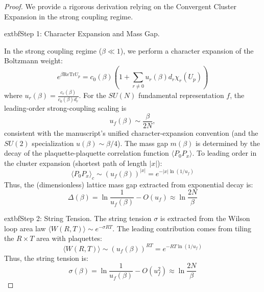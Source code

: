 \begin{proof}
We provide a rigorous derivation relying on the Convergent Cluster Expansion in the strong coupling regime.

		extbf{Step 1: Character Expansion and Mass Gap.}

In the strong coupling regime ($\beta \ll 1$), we perform a character expansion of the Boltzmann weight:
\begin{equation}
\label{eq:dbg-gtv2-character-expansion}
e^{\beta \mathrm{Re}\mathrm{Tr} U_p} = c_0(\beta) \left( 1 + \sum_{r \neq 0} u_r(\beta) d_r \chi_r(U_p) \right)
\end{equation}
where $u_r(\beta) = \frac{c_r(\beta)}{c_0(\beta) d_r}$. For the $SU(N)$ fundamental representation $f$, the leading-order strong-coupling scaling is
\begin{equation}
\label{eq:dbg-gtv2-uf-asymptotic}
u_f(\beta) \sim \frac{\beta}{2N},
\end{equation}
consistent with the manuscript's unified character-expansion convention (and the $SU(2)$ specialization $u(\beta)\sim \beta/4$).
The mass gap $m(\beta)$ is determined by the decay of the plaquette-plaquette correlation function $\langle P_0 P_x \rangle$. To leading order in the cluster expansion (shortest path of length $|x|$):
\begin{equation}
\label{eq:dbg-gtv2-plaquette-corr}
\langle P_0 P_x \rangle_c \sim (u_f(\beta))^{|x|} = e^{-|x| \ln(1/u_f)}
\end{equation}
Thus, the (dimensionless) lattice mass gap extracted from exponential decay is:
\begin{equation}
\label{eq:dbg-gtv2-gap-ln1uf}
\Delta(\beta) = \ln \frac{1}{u_f(\beta)} - O(u_f) \approx \ln \frac{2N}{\beta}
\end{equation}




			extbf{Step 2: String Tension.}
The string tension $\sigma$ is extracted from the Wilson loop area law $\langle W(R,T) \rangle \sim e^{-\sigma RT}$.
The leading contribution comes from tiling the $R \times T$ area with plaquettes:
\begin{equation}
\label{eq:dbg-gtv2-wilson-area-tiling}
\langle W(R,T) \rangle \sim (u_f(\beta))^{RT} = e^{-RT \ln(1/u_f)}
\end{equation}
Thus, the string tension is:
\begin{equation}
\label{eq:dbg-gtv2-sigma-ln1uf}
\sigma(\beta) = \ln \frac{1}{u_f(\beta)} - O(u_f^2) \approx \ln \frac{2N}{\beta}
\end{equation}



\end{proof}

